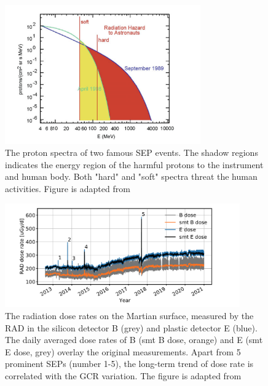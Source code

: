 \begin{figure}
	\centering
	\includegraphics[width = 0.75\textwidth]{images/SEP-radiation_hazard.png}
	\caption[The proton spectra in two SEP events indicating the possible radiation energy]{The proton spectra of two famous SEP events. The shadow regions indicates the energy region of the harmful protons to the instrument and human body. Both "hard" and "soft" spectra threat the human activities. Figure is adapted from \citep{Reames2021LNP}}
	\label{Fig:SEP-radiation_hazard}
\end{figure}


\begin{figure}
	\centering
	\includegraphics[width = 0.9\textwidth]{images/Rad_GCR_radiation.png}
	\caption[The long term radiation variation measured on the Mars surface]{The radiation dose rates on the Martian surface, measured by the \ac{RAD} in the silicon detector B (grey) and plastic detector E (blue). The daily averaged dose rates of B (smt B dose, orange) and E (smt E dose, grey) overlay the original measurements. Apart from 5 prominent SEPs (number 1-5), the long-term trend of dose rate is correlated with the \ac{GCR} variation. The figure is adapted from \citep{Guo2021AARv_rad}}
	\label{Fig:Rad_GCR_radiation}
\end{figure}



